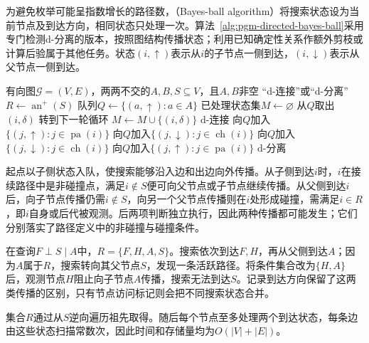 为避免枚举可能呈指数增长的路径数，（Bayes-ball algorithm）将搜索状态设为当前节点及到达方向，相同状态只处理一次。算法~\ref{alg:pgm-directed-bayes-ball}采用专门检测d-分离的版本，按照图结构传播状态；利用已知确定性关系作额外剪枝或计算后验属于其他任务。状态$(i,\uparrow)$表示从$i$的子节点一侧到达，$(i,\downarrow)$表示从父节点一侧到达。

\begin{algorithm}
  \label{alg:pgm-directed-bayes-ball}
  \begin{algorithmic}[1]
    \Require 有向图$\mathcal{G}=(V,E)$，两两不交的$A,B,S\subseteq V$，且$A,B$非空
    \Ensure “d-连接”或“d-分离”
    \State $R\gets\operatorname{an}^{+}(S)$
    \State 队列$Q\gets\{(a,\uparrow):a\in A\}$
    \State 已处理状态集$M\gets\varnothing$
      \State 从$Q$取出$(i,\delta)$
        \State 转到下一轮循环
      \EndIf
      \State $M\gets M\cup\{(i,\delta)\}$
        \State \Return d-连接
      \EndIf
        \State 向$Q$加入$\{(j,\uparrow):j\in\operatorname{pa}(i)\}$
        \State 向$Q$加入$\{(j,\downarrow):j\in\operatorname{ch}(i)\}$
      \ElsIf{$\delta=\downarrow$}
          \State 向$Q$加入$\{(j,\downarrow):j\in\operatorname{ch}(i)\}$
        \EndIf
          \State 向$Q$加入$\{(j,\uparrow):j\in\operatorname{pa}(i)\}$
        \EndIf
      \EndIf
    \EndWhile
    \State \Return d-分离
  \end{algorithmic}
\end{algorithm}

起点以子侧状态入队，使搜索能够沿入边和出边向外传播。从子侧到达$i$时，$i$在接续路径中是非碰撞点，满足$i\notin S$便可向父节点或子节点继续传播。从父侧到达$i$后，向子节点传播仍需$i\notin S$，向另一个父节点传播则在$i$处形成碰撞，需满足$i\in R$，即$i$自身或后代被观测。后两项判断独立执行，因此两种传播都可能发生；它们分别落实了路径定义中的非碰撞与碰撞条件。

在查询$F\perp S\mid A$中，$R=\{F,H,A,S\}$。搜索依次到达$F,H$，再从父侧到达$A$；因为$A$属于$R$，搜索转向其父节点$S$，发现一条活跃路径。将条件集合改为$\{H,A\}$后，观测节点$H$阻止向子节点$A$传播，搜索无法到达$S$。记录到达方向保留了这两类传播的区别，只有节点访问标记则会把不同搜索状态合并。

集合$R$通过从$S$逆向遍历祖先取得。随后每个节点至多处理两个到达状态，每条边由这些状态扫描常数次，因此时间和存储量均为$O(|V|+|E|)$。

